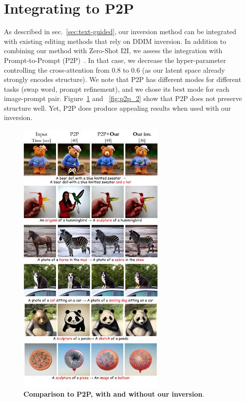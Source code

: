 
\clearpage

\section{Integrating to P2P}
As described in sec.~\ref{sec:text-guided}, our inversion method can be integrated with existing editing methods that rely on DDIM inversion. In addition to combining our method with Zero-Shot I2I, we assess the integration with Prompt-to-Prompt (P2P)~\cite{Hertz22}. In that case, we decrease the hyper-parameter controlling the cross-attention from $0.8$ to $0.6$ (as our latent space already strongly encodes structure). We note that P2P has different modes for different tasks (swap word, prompt refinement), and we chose its best mode for each image-prompt pair. Figure~\ref{fig:p2p_1} and ~\ref{fig:p2p_2} show that P2P does not preserve structure well. Yet, P2P does produce appealing results when used with our inversion. 

\begin{figure}
\centering
\includegraphics[width=0.65\textwidth]{ICCV23_submission/figures/p2p_1.pdf}
\caption{\textbf{Comparison to P2P, with and without our inversion}. }
\label{fig:p2p_1}
\end{figure}

